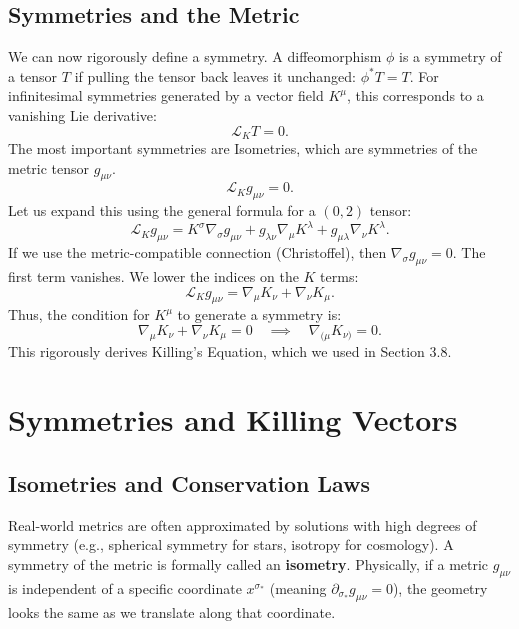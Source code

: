\documentclass[11pt, a4paper]{report}
\begin{document}
\subsection*{Symmetries and the Metric}
We can now rigorously define a symmetry. A diffeomorphism $\phi$ is a symmetry of a tensor $T$ if pulling the tensor back leaves it unchanged: $\phi^* T = T$.
For infinitesimal symmetries generated by a vector field $K^\mu$, this corresponds to a vanishing Lie derivative:
\begin{equation}
\mathcal{L}_K T = 0.
\end{equation}
The most important symmetries are Isometries, which are symmetries of the metric tensor $g_{\mu\nu}$.
\begin{equation}
\mathcal{L}_K g_{\mu\nu} = 0.
\end{equation}
Let us expand this using the general formula for a $(0, 2)$ tensor:
\begin{equation}
\mathcal{L}_K g_{\mu\nu} = K^\sigma \nabla_\sigma g_{\mu\nu} + g_{\lambda\nu} \nabla_\mu K^\lambda + g_{\mu\lambda} \nabla_\nu K^\lambda.
\end{equation}
If we use the metric-compatible connection (Christoffel), then $\nabla_\sigma g_{\mu\nu} = 0$. The first term vanishes. We lower the indices on the $K$ terms:
\begin{equation}
\mathcal{L}_K g_{\mu\nu} = \nabla_\mu K_\nu + \nabla_\nu K_\mu.
\end{equation}
Thus, the condition for $K^\mu$ to generate a symmetry is:
\begin{equation}
\nabla_\mu K_\nu + \nabla_\nu K_\mu = 0 \quad \implies \quad \nabla_{(\mu} K_{\nu)} = 0.
\end{equation}
This rigorously derives Killing's Equation, which we used in Section 3.8.

\section{Symmetries and Killing Vectors}

\subsection*{Isometries and Conservation Laws}
Real-world metrics are often approximated by solutions with high degrees of symmetry (e.g., spherical symmetry for stars, isotropy for cosmology). A symmetry of the metric is formally called an \textbf{isometry}. Physically, if a metric \(g_{\mu\nu}\) is independent of a specific coordinate \(x^{\sigma_*}\) (meaning \(\partial_{\sigma_*} g_{\mu\nu} = 0\)), the geometry looks the same as we translate along that coordinate.
\end{document}
